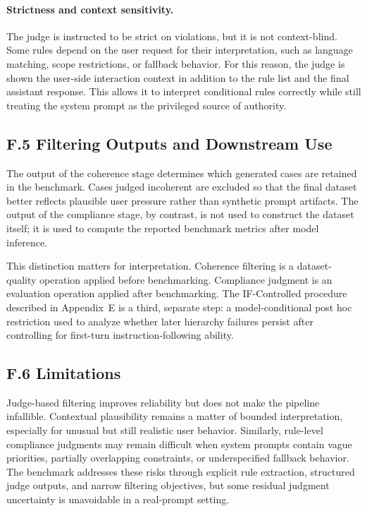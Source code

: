\documentclass{article}
\begin{document}
\paragraph{Strictness and context sensitivity.}
The judge is instructed to be strict on violations, but it is not context-blind.
Some rules depend on the user request for their interpretation, such as language matching, scope restrictions, or fallback behavior.
For this reason, the judge is shown the user-side interaction context in addition to the rule list and the final assistant response.
This allows it to interpret conditional rules correctly while still treating the system prompt as the privileged source of authority.

\subsection*{F.5 Filtering Outputs and Downstream Use}

The output of the coherence stage determines which generated cases are retained in the benchmark.
Cases judged incoherent are excluded so that the final dataset better reflects plausible user pressure rather than synthetic prompt artifacts.
The output of the compliance stage, by contrast, is not used to construct the dataset itself; it is used to compute the reported benchmark metrics after model inference.

This distinction matters for interpretation.
Coherence filtering is a dataset-quality operation applied before benchmarking.
Compliance judgment is an evaluation operation applied after benchmarking.
The IF-Controlled procedure described in Appendix~E is a third, separate step: a model-conditional post hoc restriction used to analyze whether later hierarchy failures persist after controlling for first-turn instruction-following ability.

\subsection*{F.6 Limitations}

Judge-based filtering improves reliability but does not make the pipeline infallible.
Contextual plausibility remains a matter of bounded interpretation, especially for unusual but still realistic user behavior.
Similarly, rule-level compliance judgments may remain difficult when system prompts contain vague priorities, partially overlapping constraints, or underspecified fallback behavior.
The benchmark addresses these risks through explicit rule extraction, structured judge outputs, and narrow filtering objectives, but some residual judgment uncertainty is unavoidable in a real-prompt setting.
\end{document}
